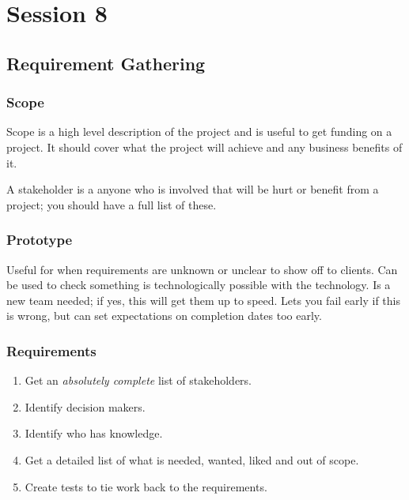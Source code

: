 \section{Session 8}\label{sec:session_8}

\subsection{Requirement Gathering}\label{sub:requirement_gathering}

\subsubsection{Scope}\label{ssub:scope}

Scope is a high level description of the project and is useful to get funding on a project.
It should cover what the project will achieve and any business benefits of it.

A stakeholder is a anyone who is involved that will be hurt or benefit from a project; you should have a full list of these.

\subsubsection{Prototype}\label{ssub:prototype}

Useful for when requirements are unknown or unclear to show off to clients.
Can be used to check something is technologically possible with the technology.
Is a new team needed; if yes, this will get them up to speed.
Lets you fail early if this is wrong, but can set expectations on completion dates too early.

\subsubsection{Requirements}\label{ssub:requirements}

\begin{enumerate}
	\item Get an \emph{absolutely complete} list of stakeholders.
	\item Identify decision makers.
	\item Identify who has knowledge.
	\item Get a detailed list of what is needed, wanted, liked and out of scope.
	\item Create tests to tie work back to the requirements.
\end{enumerate}

